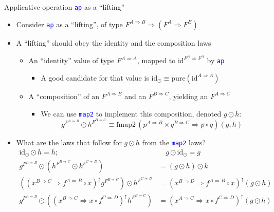 \documentclass[english]{beamer}
\begin{document}
\begin{frame}{Applicative operation \texttt{\textcolor{blue}{\footnotesize{}ap}}
as a ``lifting''}
\begin{itemize}
\item \vspace{-0.18cm}Consider \texttt{\textcolor{blue}{\footnotesize{}ap}}
as a ``lifting'', of type{\footnotesize{} $F^{A\Rightarrow B}\Rightarrow\left(F^{A}\Rightarrow F^{B}\right)$}{\footnotesize \par}
\item A ``lifting'' should obey the identity and the composition laws
\begin{itemize}
\item An ``identity'' value of type $F^{A\Rightarrow A}$, mapped to $\text{id}^{F^{A}\Rightarrow F^{A}}$
by \texttt{\textcolor{blue}{\footnotesize{}ap}} 
\begin{itemize}
\item A good candidate for that value is $\text{id}_{\odot}\equiv\text{pure}\left(\text{id}^{A\Rightarrow A}\right)$
\end{itemize}
\item A ``composition'' of an $F^{A\Rightarrow B}$ and an $F^{B\Rightarrow C}$,
yielding an $F^{A\Rightarrow C}$
\begin{itemize}
\item We can use \texttt{\textcolor{blue}{\footnotesize{}map2}} to implement
this composition, denoted $g\odot h$:
\[
g^{F^{A\Rightarrow B}}\odot h^{F^{B\Rightarrow C}}\equiv\text{fmap2}\,(p^{A\Rightarrow B}\times q^{B\Rightarrow C}\Rightarrow p\circ q)\left(g,h\right)
\]
\end{itemize}
\end{itemize}
\item What are the laws that follow for $g\odot h$ from the \texttt{\textcolor{blue}{\footnotesize{}map2}}
laws?{\footnotesize{}
\begin{align*}
\text{id}_{\odot}\odot h=h; & \quad g\odot\text{id}_{\odot}=g\\
g^{F^{A\Rightarrow B}}\odot(h^{F^{B\Rightarrow C}}\odot k^{F^{C\Rightarrow D}}) & =\left(g\odot h\right)\odot k\\
\left((x^{B\Rightarrow C}\Rightarrow f^{A\Rightarrow B}\circ x)^{\uparrow}g^{F^{B\Rightarrow C}}\right)\odot h^{F^{C\Rightarrow D}} & =(x^{B\Rightarrow D}\Rightarrow f^{A\Rightarrow B}\circ x)^{\uparrow}\left(g\odot h\right)\\
g^{F^{A\Rightarrow B}}\odot\left((x^{B\Rightarrow C}\Rightarrow x\circ f^{C\Rightarrow D})^{\uparrow}h^{F^{B\Rightarrow C}}\right) & =(x^{A\Rightarrow C}\Rightarrow x\circ f^{C\Rightarrow D})^{\uparrow}\left(g\odot h\right)

\end{align*}}
\end{itemize}
\end{frame}
\end{document}
